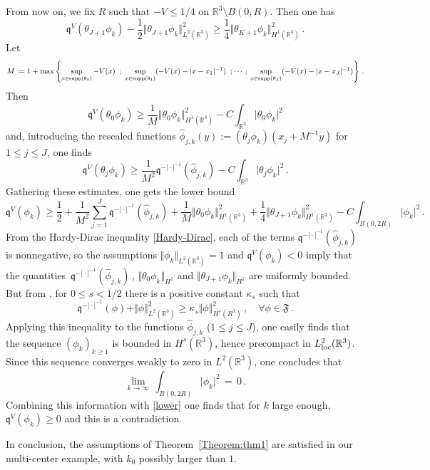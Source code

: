 \documentclass[12pt,reqno]{amsart}
\newcommand{\R}{{\mathbb R}}
\newcommand{\be}[1]{\begin{equation}\label{#1}}
\newcommand{\ee}{\end{equation}}
\renewcommand{\(}{\left(}
\renewcommand{\)}{\right)}
\begin{document}
From now on, we fix $R$ such that $-V\leq 1/4$ on $\R^3\setminus B(0,R)$. Then one has
\[\mathfrak{q}^V(\theta_{J+1}\phi_k)-\frac{1}{2}\Vert\theta_{J+1}\phi_k\Vert_{L^2(\R^3)}^2\geq \frac{1}{4}\Vert \theta_{K+1}\phi_k\Vert_{H^1(\R^3)}^2\,.
\]
Let
\[M:=1+\max\left\{\sup_{x\in {\rm supp}(\theta_0)}-V(x)\;\;;\;\sup_{x\in {\rm supp}(\theta_1)}(-V(x)-\vert x-x_1\vert^{-1})\;\;;\cdots;\;\sup_{x\in {\rm supp}(\theta_J)}(-V(x)-\vert x-x_J\vert^{-1})\right\}\,.\]
Then
\[\mathfrak{q}^V(\theta_0\phi_k)\geq \frac{1}{M}\Vert \theta_{0}\phi_k\Vert_{H^1(\R^3)}^2-C\int_{\R^3}\vert\theta_{0}\phi_k\vert^2\]
and, introducing the rescaled functions   $\hat{\phi}_{j,k}(y):=(\theta_j\phi_k)(x_j+M^{-1}y)$ for $1\leq j\leq J$, one finds
\[\mathfrak{q}^V(\theta_j\phi_k)\geq \frac{1}{M^2}\mathfrak{q}^{-\vert \cdot\vert^{-1}}(\hat{\phi}_{j,k})-C\int_{\R^3}\vert\theta_{j}\phi_k\vert^2\,.\]
Gathering these estimates, one gets the lower bound
\be{lower}\mathfrak{q}^V(\phi_k)\geq \frac{1}{2}+\frac{1}{M^2}\sum_{j=1}^J \mathfrak{q}^{-\vert \cdot\vert^{-1}}(\hat{\phi}_{j,k}) + \frac{1}{M}\Vert \theta_{0}\phi_k\Vert^2_{H^1(\R^3)}+\frac{1}{4}\Vert \theta_{J+1}\phi_k\Vert^2_{H^1(\R^3)}-C\int_{B(0,2R)}\vert\phi_k\vert^2\,.\ee
From the Hardy-Dirac inequality \eqref{Hardy-Dirac}, each of the terms $\mathfrak{q}^{-\vert \cdot\vert^{-1}}(\hat{\phi}_{j,k})$ is nonnegative, so the assumptions $\Vert\phi_k\Vert_{L^2(\R^3)}=1$ and
$\mathfrak{q}^V(\phi_k)<0$ imply that the quantities $\,\mathfrak{q}^{-\vert \cdot\vert^{-1}}(\hat{\phi}_{j,k})\,$, $\Vert\theta_{0}\phi_k\Vert_{H^1}$ and $\Vert\theta_{J+1}\phi_k\Vert_{H^1}$ are uniformly bounded. But from \cite[Theorem 1.9]{ELS19}, for $0\leq s<1/2$ there is a positive constant $\kappa_s$ such that
\[\mathfrak{q}^{-\vert \cdot\vert^{-1}}(\phi)+\Vert\phi\Vert^2_{L^2(\R^3)}\geq \kappa_s\Vert\phi\Vert^2_{H^s(R^3)}\,,\quad\forall \phi\in\mathfrak{F}\,.
\]
Applying this inequality to the functions $\hat{\phi}_{j,k}$ ($1\leq j\leq J$), one easily finds that the sequence $(\phi_k)_{k\geq 1}$ is bounded in $H^s(\R^3)$, hence precompact in $L^2_{\rm loc}(\R^3)$. Since this sequence converges weakly to zero in $L^2(\R^3)$, one concludes that
\[\lim_{k\to\infty}\, \int_{B(0,2R)}\vert\phi_k\vert^2\,=\,0\,.\]
Combining this information with \eqref{lower} one finds that for $k$ large enough, $\mathfrak{q}^V(\phi_k)\geq 0$ and this is a contradiction.

\noindent
In conclusion, the assumptions of Theorem~\ref{Theorem:thm1} are satisfied in our multi-center example, with $k_0$ possibly larger than $1$.
\end{document}
